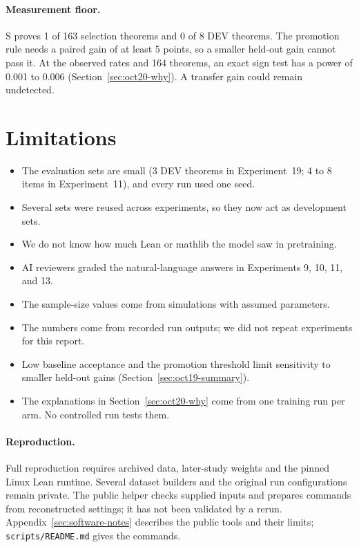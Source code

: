 \documentclass[11pt]{article}
\newcommand{\pth}[1]{\nolinkurl{#1}}
\begin{document}
\paragraph{Measurement floor.}
S proves 1 of 163 selection theorems and 0 of 8 DEV theorems.
The promotion rule needs a paired gain of at least 5 points, so a smaller held-out gain cannot pass it.
At the observed rates and 164 theorems, an exact sign test has a power of 0.001 to 0.006 (Section~\ref{sec:oct20-why}).
A transfer gain could remain undetected.

\section{Limitations}
\begin{itemize}
\item The evaluation sets are small (3 DEV theorems in Experiment~19; 4 to 8 items in Experiment~11), and every run used one seed.
\item Several sets were reused across experiments, so they now act as development sets.
\item We do not know how much Lean or mathlib the model saw in pretraining.
\item AI reviewers graded the natural-language answers in Experiments 9, 10, 11, and 13.
\item The sample-size values come from simulations with assumed parameters.
\item The numbers come from recorded run outputs; we did not repeat experiments for this report.
\item Low baseline acceptance and the promotion threshold limit sensitivity to smaller held-out gains (Section~\ref{sec:oct19-summary}).
\item The explanations in Section~\ref{sec:oct20-why} come from one training run per arm. No controlled run tests them.
\end{itemize}

\paragraph{Reproduction.}
Full reproduction requires archived data, later-study weights and the pinned Linux Lean runtime.
Several dataset builders and the original run configurations remain private.
The public helper checks supplied inputs and prepares commands from reconstructed settings; it has not been validated by a rerun.
Appendix~\ref{sec:software-notes} describes the public tools and their limits; \pth{scripts/README.md} gives the commands.
\end{document}
